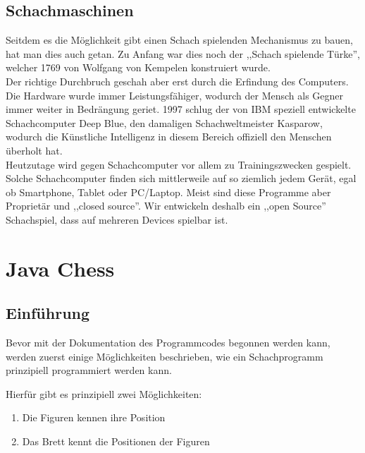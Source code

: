 \documentclass[12pt,a4paper]{article}
\begin{document}
{\subsection{Schachmaschinen}
\label{SUBSUBSEC:CHESS-COMPUTERS}

Seitdem es die Möglichkeit gibt einen Schach spielenden Mechanismus zu bauen, hat man dies auch getan. Zu Anfang war dies noch der ,,Schach spielende Türke'', welcher 1769 von Wolfgang von Kempelen konstruiert wurde. \\ 
Der richtige Durchbruch geschah aber erst durch die Erfindung des Computers. Die Hardware wurde immer Leistungsfähiger, wodurch der Mensch als Gegner immer weiter in Bedrängung geriet. 1997 schlug der von IBM speziell entwickelte Schachcomputer Deep Blue, den damaligen Schachweltmeister Kasparow, wodurch die Künstliche Intelligenz in diesem Bereich offiziell den Menschen überholt hat. \\
Heutzutage wird gegen Schachcomputer vor allem zu Trainingszwecken gespielt. Solche Schachcomputer finden sich mittlerweile auf so ziemlich jedem Gerät, egal ob Smartphone, Tablet oder PC/Laptop. Meist sind diese Programme aber Proprietär und ,,closed source''. Wir entwickeln deshalb ein ,,open Source'' Schachspiel, dass auf mehreren Devices spielbar ist.
 



 
\clearpage\vfill\newpage{}

\section{Java Chess}
\label{SEC:JAVACHESS}

\subsection{Einführung}
\label{SUBSEC:JAVACHESS-INTRO}

Bevor mit der Dokumentation des Programmcodes begonnen werden kann, werden zuerst einige Möglichkeiten beschrieben, wie ein Schachprogramm prinzipiell programmiert werden kann.

Hierfür gibt es prinzipiell zwei Möglichkeiten:
\begin{enumerate}
	\item{Die Figuren kennen ihre Position}
	\item{Das Brett kennt die Positionen der Figuren}
\end{enumerate}

}
\end{document}
